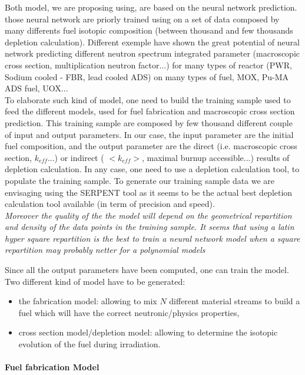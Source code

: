 \documentclass[dvips,12pt]{article}
\begin{document}
	
Both model, we are proposing using, are based on the neural network prediction. those neural network are priorly trained using on a set of data composed by many differents fuel isotopic composition (between thousand and few thousands depletion calculation).
Different exemple have shown the great potential of neural network predicting different neutron spectrum integrated parameter (macroscopic cross section, multiplication neutron factor...) for many types of reactor (PWR, Sodium cooled - FBR,  lead cooled ADS) on many types of fuel, MOX, Pu-MA ADS fuel, UOX...\\

 
To elaborate such kind of model, one need to build the training sample used to feed the different models, used for fuel fabrication and macroscopic cross section prediction.
This training sample are composed by few thousand different couple of input and output parameters. In our case, the input parameter are the initial fuel composition, and the output parameter are the direct (i.e. macroscopic cross section, $k_{eff}$...) or indirect ( $<k_{eff}>$, maximal burnup accessible...) results of depletion calculation. 
In any case, one need to use a depletion calculation tool, to populate the training sample. 
To generate our training sample data we are envisaging using the SERPENT tool as it seems to be the actual best depletion calculation tool available (in term of precision and speed).%
\\
\textit{Moreover the quality of the the model will depend on the geometrical repartition and density of the data points in the training sample.
It seems that using a latin hyper square repartition \cite{} is the best to train a neural network model when a square repartition may probably netter for a polynomial models } %

Since all the output parameters have been computed, one can train the model. Two different kind of model have to be generated: 
\begin{itemize}
\item the fabrication model: allowing to mix $N$ different material streams to build a fuel which will have the correct neutronic/physics properties,
\item cross section model/depletion model: allowing to determine the isotopic evolution of the fuel during irradiation.
\end{itemize}

\paragraph{Fuel fabrication Model\\}	
\end{document}
